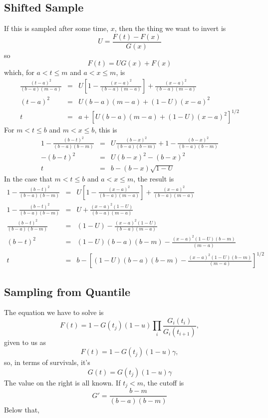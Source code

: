 \documentclass{article}
\begin{document}
\subsection{Shifted Sample}
If this is sampled after some time, $x$, then the thing
we want to invert is
\begin{equation}
  U=\frac{F(t)-F(x)}{G(x)}
\end{equation}
so
\begin{equation}
  F(t)=UG(x)+F(x)
\end{equation}
which, for $a<t\le m$ and $a<x\le m$, is
\begin{eqnarray}
  \frac{(t-a)^2}{(b-a)(m-a)} & = & U\left[1-\frac{(x-a)^2}{(b-a)(m-a)}\right]
  +\frac{(x-a)^2}{(b-a)(m-a)} \\
  (t-a)^2 & = & U(b-a)(m-a)+ (1-U)(x-a)^2 \\
  t & = & a + \left[U(b-a)(m-a)+ (1-U)(x-a)^2\right]^{1/2}
\end{eqnarray}
For $m<t\le b$ and $m<x\le b$, this is
\begin{eqnarray}
  1-\frac{(b-t)^2}{(b-a)(b-m)} & = & U\frac{(b-x)^2}{(b-a)(b-m)}+
    1-\frac{(b-x)^2}{(b-a)(b-m)} \\
  -(b-t)^2 & = & U(b-x)^2-(b-x)^2 \\
  t & = & b-(b-x)\sqrt{1-U}
\end{eqnarray}
In the case that $m<t\le b$ and $a<x\le m$, the result is
\begin{eqnarray}
  1-\frac{(b-t)^2}{(b-a)(b-m)} & = & U\left[1-\frac{(x-a)^2}{(b-a)(m-a)}\right]
   + \frac{(x-a)^2}{(b-a)(m-a)}\\
  1-\frac{(b-t)^2}{(b-a)(b-m)} & = &U+\frac{(x-a)^2(1-U)}{(b-a)(m-a)} \\
  \frac{(b-t)^2}{(b-a)(b-m)} & = &(1-U)-\frac{(x-a)^2(1-U)}{(b-a)(m-a)} \\
  (b-t)^2& = &(1-U)(b-a)(b-m)-\frac{(x-a)^2(1-U)(b-m)}{(m-a)} \\
  t & = & b-\left[(1-U)(b-a)(b-m)-\frac{(x-a)^2(1-U)(b-m)}{(m-a)}\right]^{1/2}
\end{eqnarray}

\subsection{Sampling from Quantile}
The equation we have to solve is
\begin{equation}
  F(t)=1-G(t_j)(1-u)\prod_i\frac{G_i(t_i)}{G_i(t_{i+1})},
\end{equation}
given to us as
\begin{equation}
  F(t)=1-G(t_j)(1-u)\gamma,
\end{equation}
so, in terms of survivals, it's
\begin{equation}
  G(t)=G(t_j)(1-u)\gamma
\end{equation}
The value on the right is all known.
If $t_j<m$, the cutoff is
\begin{equation}
  G'=\frac{b-m}{(b-a)(b-m)}
\end{equation}
Below that,
\end{document}
